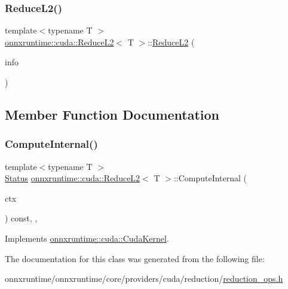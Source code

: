 \subsubsection{\texorpdfstring{Reduce\+L2()}{ReduceL2()}}
{\footnotesize\ttfamily template$<$typename T $>$ \\
\mbox{\hyperlink{classonnxruntime_1_1cuda_1_1ReduceL2}{onnxruntime\+::cuda\+::\+Reduce\+L2}}$<$ T $>$\+::\mbox{\hyperlink{classonnxruntime_1_1cuda_1_1ReduceL2}{Reduce\+L2}} (\begin{DoxyParamCaption}\item[{const \mbox{\hyperlink{classonnxruntime_1_1OpKernelInfo}{Op\+Kernel\+Info}} \&}]{info }\end{DoxyParamCaption})\hspace{0.3cm}{\ttfamily [inline]}}



\subsection{Member Function Documentation}
\mbox{\label{classonnxruntime_1_1cuda_1_1ReduceL2_a4891c57ba263b1d3926d273eb18f64af}} 
\subsubsection{\texorpdfstring{Compute\+Internal()}{ComputeInternal()}}
{\footnotesize\ttfamily template$<$typename T $>$ \\
\mbox{\hyperlink{classonnxruntime_1_1common_1_1Status}{Status}} \mbox{\hyperlink{classonnxruntime_1_1cuda_1_1ReduceL2}{onnxruntime\+::cuda\+::\+Reduce\+L2}}$<$ T $>$\+::Compute\+Internal (\begin{DoxyParamCaption}\item[{\mbox{\hyperlink{classonnxruntime_1_1OpKernelContext}{Op\+Kernel\+Context}} $\ast$}]{ctx }\end{DoxyParamCaption}) const\hspace{0.3cm}{\ttfamily [inline]}, {\ttfamily [override]}, {\ttfamily [virtual]}}



Implements \mbox{\hyperlink{classonnxruntime_1_1cuda_1_1CudaKernel_aca7af04ae448017d6023d30bba231ebb}{onnxruntime\+::cuda\+::\+Cuda\+Kernel}}.



The documentation for this class was generated from the following file\+:\begin{DoxyCompactItemize}
\item 
onnxruntime/onnxruntime/core/providers/cuda/reduction/\mbox{\hyperlink{cuda_2reduction_2reduction__ops_8h}{reduction\+\_\+ops.\+h}}\end{DoxyCompactItemize}

